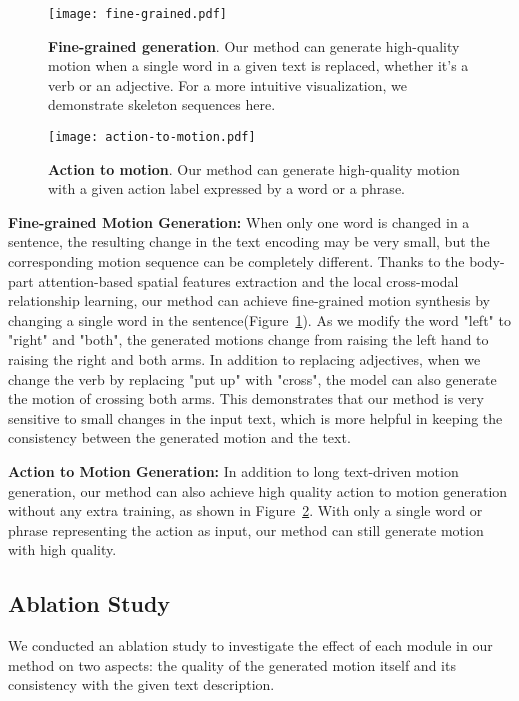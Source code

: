 \documentclass[10pt,twocolumn,letterpaper]{article}
\begin{document}
\begin{figure}[t]
    \centering
    \texttt{[image: fine-grained.pdf]}
    \caption{\textbf{Fine-grained generation}. Our method can generate high-quality motion when a single word in a given text is replaced, whether it's a verb or an adjective. For a more intuitive visualization, we demonstrate skeleton sequences here.}
    \label{img:06}
\end{figure}

\begin{figure}[t]
    \centering
    \texttt{[image: action-to-motion.pdf]}
    \caption{\textbf{Action to motion}. Our method can generate high-quality motion with a given action label expressed by a word or a phrase.}
    \label{img:08}
\end{figure}

\textbf{Fine-grained Motion Generation:}
When only one word is changed in a sentence, the resulting change in the text encoding may be very small, but the corresponding motion sequence can be completely different. Thanks to the body-part attention-based spatial features extraction and the local cross-modal relationship learning, our method can achieve fine-grained motion synthesis by changing a single word in the sentence(Figure~\ref{img:06}). As we modify the word "left" to "right" and "both", the generated motions change from raising the left hand to raising the right and both arms. In addition to replacing adjectives, when we change the verb by replacing "put up" with "cross", the model can also generate the motion of crossing both arms. This demonstrates that our method is very sensitive to small changes in the input text, which is more helpful in keeping the consistency between the generated motion and the text. 



\textbf{Action to Motion Generation:}
In addition to long text-driven motion generation, our method can also achieve high quality action to motion generation without any extra training, as shown in Figure~\ref{img:08}. With only a single word or phrase representing the action as input, our method can still generate motion with high quality.




\subsection{Ablation Study}\label{ssec:ablation_study}
We conducted an ablation study to investigate the effect of each module in our method on two aspects: the quality of the generated motion itself and its consistency with the given text description. 
\end{document}
